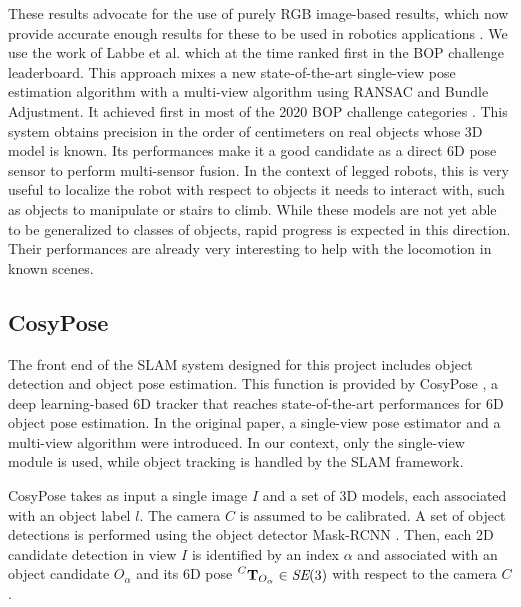 These results advocate for the use of purely RGB image-based results, which now provide accurate enough results for these to be used in robotics applications 
\cite{labbe2021single}. We use the work of Labbe et al. \cite{labbe2020cosypose} which at the time ranked first in the BOP challenge leaderboard.
This approach mixes a new state-of-the-art single-view pose estimation algorithm with a multi-view algorithm using RANSAC and Bundle Adjustment. 
It achieved first in most of the 2020 BOP challenge categories \cite{hodavn2020bop}. This system obtains precision in the order of centimeters 
on real objects whose 3D model is known. Its performances make it a good candidate as a direct 6D pose sensor to perform multi-sensor fusion. 
In the context of legged robots, this is very useful to localize the robot with respect to objects it needs to interact with, such as objects 
to manipulate or stairs to climb. While these models are not yet able to be generalized to classes of objects, rapid progress is expected in 
this direction. Their performances are already very interesting to help with the locomotion in known scenes.

\subsection{CosyPose}
The front end of the SLAM system designed for this project includes object detection and object pose estimation. 
This function is provided by CosyPose \cite{labbe2020cosypose}, a deep learning-based 6D tracker that reaches state-of-the-art
 performances for 6D object pose estimation. %
In the original paper, a single-view pose estimator and a multi-view algorithm were introduced. In our context, only the single-view module is used, 
while object tracking is handled by the SLAM framework. 

CosyPose takes as input a single image $I$ and a set of 3D models, each associated with an object label $l$. The camera $C$ is assumed to be calibrated. 
A set of object detections is performed using the object detector Mask-RCNN \cite{he2018mask}. Then, each 2D candidate detection in view $I$ is identified 
by an index $\alpha$ and associated with an object candidate $O_{\alpha}$ and its 6D pose $\prescript{C}{}{{\bf T}}_{O_{\alpha}} \in \textit{SE} (3)$ with respect to the camera $C$.

